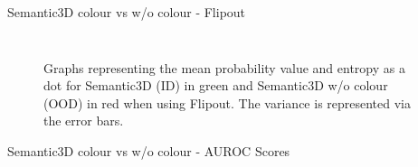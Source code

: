 \documentclass[aspectratio=169]{beamer}
\begin{document}
\begin{frame}{Semantic3D colour vs w/o colour - Flipout}
\begin{columns}
\begin{column}{0.5\textwidth}
\begin{figure}
            \end{figure}
        \end{column}
    \end{columns}
    \begin{figure}
        \caption{Graphs representing the mean probability value and entropy as a dot for Semantic3D (ID) in green and
        Semantic3D w/o colour (OOD) in red when using Flipout. The variance is represented via the error bars.}
    \end{figure}
\end{frame}

\begin{frame}{Semantic3D colour vs w/o colour - AUROC Scores}
    \begin{table}[h!]
\end{table}
\end{frame}
\end{document}
